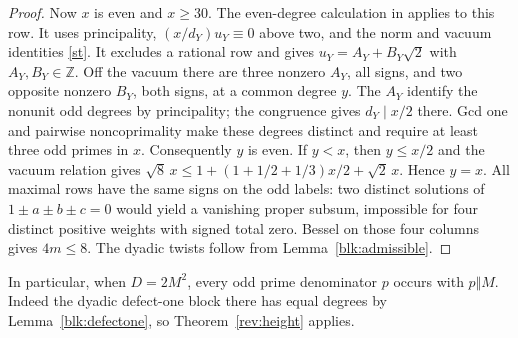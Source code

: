 \documentclass[11pt]{amsart}
\numberwithin{equation}{section}
\theoremstyle{definition}
\theoremstyle{plain}
\newcommand{\ZZ}{\mathbb Z}
\begin{document}
\begin{proof}
Now $x$ is even and $x\ge30$. The even-degree calculation in
\cite[proof of Theorem~20.7]{BDPcore} applies to this row. It uses
principality, $(x/d_Y)u_Y\equiv0$ above two, and the norm and vacuum
identities \eqref{st}. It excludes a rational row and gives
$u_Y=A_Y+B_Y\sqrt2$ with $A_Y,B_Y\in\ZZ$. Off the vacuum there are
three nonzero $A_Y$, all signs, and two opposite nonzero $B_Y$, both
signs, at a common degree $y$. The $A_Y$ identify the nonunit odd
degrees by principality; the congruence gives $d_Y\mid x/2$ there.
Gcd one and pairwise noncoprimality make these degrees distinct and
require at least three odd primes in $x$. Consequently $y$ is even.
If $y<x$, then $y\le x/2$ and the vacuum relation gives
$\sqrt8\,x\le1+(1+1/2+1/3)x/2+\sqrt2\,x$. Hence $y=x$.
All maximal rows have the same signs on the odd labels: two distinct
solutions of $1\pm a\pm b\pm c=0$ would yield a vanishing proper
subsum, impossible for four distinct positive weights with signed
total zero. Bessel on those four columns gives $4m\le8$. The dyadic
twists follow from Lemma~\ref{blk:admissible}.
\end{proof}

In particular, when $D=2M^2$, every odd prime denominator $p$ occurs
with $p\Vert M$. Indeed the dyadic defect-one block there has equal
degrees by Lemma~\ref{blk:defectone}, so Theorem~\ref{rev:height} applies.
\end{document}
